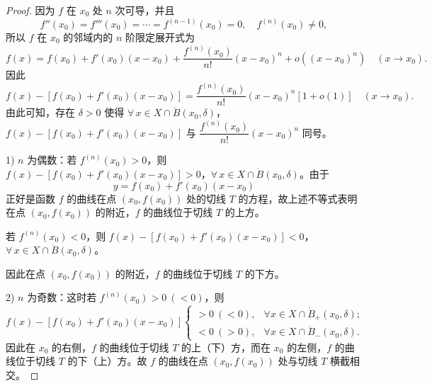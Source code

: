 \begin{proof}

因为 $f$ 在 $x_0$ 处 $n$ 次可导，并且
\[f''(x_0)=f'''(x_0)=\cdots=f^{(n-1)}(x_0)=0,\quad f^{(n)}(x_0)\neq0,\]
所以 $f$ 在 $x_0$ 的邻域内的 $n$ 阶限定展开式为
\[f(x)=f(x_0)+f'(x_0)(x-x_0)+\frac{f^{(n)}(x_0)}{n!}(x-x_0)^n+o((x-x_0)^n)\quad(x\to x_0).\]
因此
\[f(x)-[f(x_0)+f'(x_0)(x-x_0)]=\frac{f^{(n)}(x_0)}{n!}(x-x_0)^n[1+o(1)]\quad(x\to x_0).\]
由此可知，存在 $\delta>0$ 使得 $\forall\,x\in X\cap\mathring{B}(x_0,\delta)$，$f(x)-[f(x_0)+f'(x_0)(x-x_0)]$ 与 $\dfrac{f^{(n)}(x_0)}{n!}(x-x_0)^n$ 同号。

1) $n$ 为偶数：若 $f^{(n)}(x_0)>0$，则 $f(x)-[f(x_0)+f'(x_0)(x-x_0)]>0$，$\forall\,x\in X\cap\mathring{B}(x_0,\delta)$。由于
\[y=f(x_0)+f'(x_0)(x-x_0)\]
正好是函数 $f$ 的曲线在点 $(x_0,f(x_0))$ 处的切线 $T$ 的方程，故上述不等式表明在点 $(x_0,f(x_0))$ 的附近，$f$ 的曲线位于切线 $T$ 的上方。

若 $f^{(n)}(x_0)<0$，则 $f(x)-[f(x_0)+f'(x_0)(x-x_0)]<0$，$\forall\,x\in X\cap\mathring{B}(x_0,\delta)$。

因此在点 $(x_0,f(x_0))$ 的附近，$f$ 的曲线位于切线 $T$ 的下方。

2) $n$ 为奇数：这时若 $f^{(n)}(x_0)>0\ (<0)$，则
\[f(x)-[f(x_0)+f'(x_0)(x-x_0)]\begin{cases} >0\ (<0), & \forall x\in X\cap\mathring{B}_+(x_0,\delta);\\ <0\ (>0), & \forall x\in X\cap\mathring{B}_-(x_0,\delta). \end{cases}\]
因此在 $x_0$ 的右侧，$f$ 的曲线位于切线 $T$ 的上（下）方，而在 $x_0$ 的左侧，$f$ 的曲线位于切线 $T$ 的下（上）方。故 $f$ 的曲线在点 $(x_0,f(x_0))$ 处与切线 $T$ 横截相交。

\end{proof}

